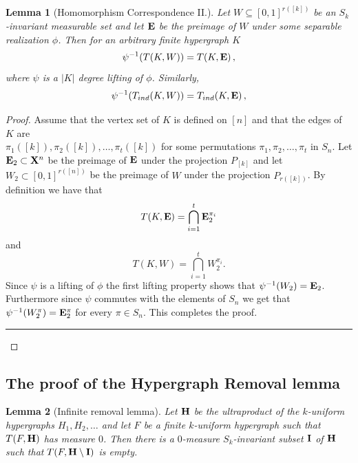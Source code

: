 \documentclass [11pt] {article}
\newcommand{\qed} {\hspace {0.1in} \rule {1.5mm} {3.5mm}}
\newtheorem{lemma}{Lemma}[section]
\def\bE{{\bf E}}
\def\xo{{\bf X}}
\begin{document}
\begin{lemma}[Homomorphism Correspondence II.]\label{homcor2} Let $W\subseteq
  [0,1]^{r([k])}$ be an $S_k$-invariant measurable set and
let $\bE$ be the preimage of $W$ under some separable realization
$\phi$. Then for an arbitrary
finite hypergraph $K$
$$\psi^{-1}(T(K,W))=T(K,\bE)\,,$$ where $\psi$ is a $|K|$ degree lifting
of $\phi$. Similarly, 
$$\psi^{-1}(T_{ind}(K,W))=T_{ind}(K,\bE)\,,$$
\end{lemma}

\begin{proof} Assume that the vertex set of $K$ is defined on $[n]$ and that
  the edges of $K$ are \\ $\pi_1([k]),\pi_2([k]),
\dots,\pi_t([k])$ for some permutations $\pi_1,\pi_2,\dots,\pi_t$ in
$S_n$. Let $\bE_2\subset \xo^n$ be the preimage of $\bE$
under the projection $P_{[k]}$ and let $W_2\subset [0,1]^{r([n])}$ be the
preimage of $W$ under
the projection $P_{r([k])}$. By definition we have that
$$T(K,\bE)=\bigcap_{i=1}^t \bE_2^{\pi_i}$$ and
$$T(K,W)=\bigcap_{i=1}^t W_2^{\pi_i}.$$
Since $\psi$ is a lifting of $\phi$ the first lifting property shows that
$\psi^{-1}(W_2)=\bE_2$. Furthermore since $\psi$ commutes
with the elements of $S_n$ we get that $\psi^{-1}(W_2^\pi)=\bE_2^{\pi}$ for
every $\pi\in S_n$.
This completes the proof.
\qed\end{proof}

\subsection{The proof of the Hypergraph Removal lemma}

\begin{lemma}[Infinite removal lemma] Let ${\bf H}$ be the ultraproduct of
  the $k$-uniform hypergraphs $H_1,H_2,\dots$ and
let $F$ be a finite $k$-uniform hypergraph such that $T(F,{\bf H})$ has
measure $0$. Then there is a $0$-measure $S_k$-invariant subset ${\bf I}$
 of ${\bf H}$ such that $T(F,{\bf H}
\setminus{\bf I})$ is empty.
\end{lemma}
\end{document}
